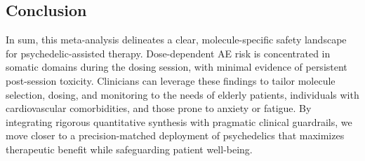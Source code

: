 \subsection{Conclusion}

In sum, this meta-analysis delineates a clear, molecule-specific safety landscape for psychedelic-assisted therapy.
Dose-dependent AE risk is concentrated in somatic domains during the dosing session, with minimal evidence of persistent post-session toxicity.
Clinicians can leverage these findings to tailor molecule selection, dosing, and monitoring to the needs of elderly patients, individuals with cardiovascular comorbidities, and those prone to anxiety or fatigue.
By integrating rigorous quantitative synthesis with pragmatic clinical guardrails, we move closer to a precision-matched deployment of psychedelics that maximizes therapeutic benefit while safeguarding patient well-being.
